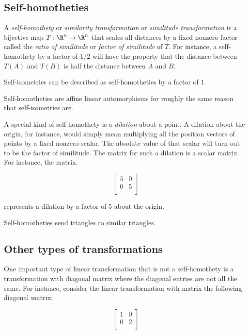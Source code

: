 \documentclass[10pt]{amsart}
\begin{document}
\subsection{Self-homotheties}

A {\em self-homothety} or {\em similarity transformation} or {\em
  similitude transformation} is a bijective map $T:\R^n \to \R^n$ that
scales all distances by a fixed nonzero factor called the {\em ratio
  of similitude} or {\em factor of similitude} of $T$. For instance, a
self-homothety by a factor of $1/2$ will have the property that the
distance between $T(A)$ and $T(B)$ is half the distance between $A$
and $B$.

Self-isometries can be described as self-homotheties by a factor of
$1$.

Self-homotheties are affine linear automorphisms for roughly the same
reason that self-isometries are.

A special kind of self-homothety is a {\em dilation} about a point. A
dilation about the origin, for instance, would simply mean multiplying
all the position vectors of points by a fixed nonzero scalar. The
absolute value of that scalar will turn out to be the factor of
similitude. The matrix for such a dilation is a scalar matrix. For
instance, the matrix:

$$\left[\begin{matrix} 5 & 0 \\ 0 & 5 \\\end{matrix}\right]$$

represents a dilation by a factor of $5$ about the origin.

Self-homotheties send triangles to similar triangles.

\subsection{Other types of transformations}

One important type of linear transformation that is not a
self-homothety is a transformation with diagonal matrix where the
diagonal entries are not all the same. For instance, consider the
linear transformation with matrix the following diagonal matrix:

$$\left[\begin{matrix} 1 & 0 \\ 0 & 2 \\\end{matrix}\right]$$
\end{document}
